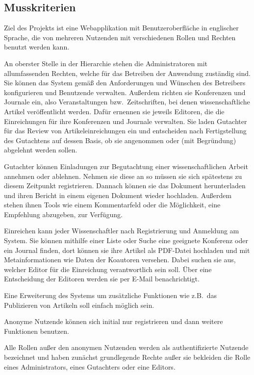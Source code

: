
\subsection{Musskriterien}
Ziel des Projekts ist eine Webapplikation mit Benutzeroberfläche in englischer Sprache, die von mehreren Nutzenden mit verschiedenen Rollen und Rechten benutzt werden kann.

An oberster Stelle in der Hierarchie stehen die Administratoren mit allumfassenden Rechten, welche für das Betreiben der Anwendung zuständig sind.
Sie können das System gemäß den Anforderungen und Wünschen des Betreibers konfigurieren und Benutzende verwalten.
Außerdem richten sie Konferenzen und Journale ein, also Veranstaltungen bzw.\ Zeitschriften, bei denen wissenschaftliche Artikel veröffentlicht werden.
Dafür ernennen sie jeweils Editoren, die die Einreichungen für ihre Konferenzen und Journale verwalten.
Sie laden Gutachter für das Review von Artikeleinreichungen ein und entscheiden nach Fertigstellung des Gutachtens auf dessen Basis, ob sie angenommen oder (mit Begründung) abgelehnt werden sollen.

Gutachter können Einladungen zur Begutachtung einer wissenschaftlichen Arbeit annehmen oder ablehnen.
Nehmen sie diese an so müssen sie sich spätestens zu diesem Zeitpunkt registrieren.
Dannach können sie das Dokument herunterladen und ihren Bericht in einem eigenen Dokument wieder hochladen.
Außerdem stehen ihnen Tools wie einem Kommentarfeld oder die Möglichkeit, eine Empfehlung abzugeben, zur Verfügung.

Einreichen kann jeder Wissenschaftler nach Registrierung und Anmeldung am System.
Sie können mithilfe einer Liste oder Suche eine geeignete Konferenz oder ein Journal finden,
dort können sie ihre Artikel als PDF-Datei hochladen und mit Metainformationen wie Daten der Koautoren versehen.
Dabei suchen sie aus, welcher Editor für die Einreichung verantwortlich sein soll.
Über eine Entscheidung der Editoren werden sie per E-Mail benachrichtigt.

Eine Erweiterung des Systems um zusätzliche Funktionen wie z.B.\ das Publizieren von Artikeln soll einfach möglich sein.

Anonyme Nutzende können sich initial nur registrieren und dann weitere Funktionen benutzen.

Alle Rollen außer den anonymen Nutzenden werden als authentifizierte Nutzende bezeichnet und haben zunächst grundlegende Rechte außer sie bekleiden die Rolle eines Administrators, eines Gutachters oder eine Editors.

